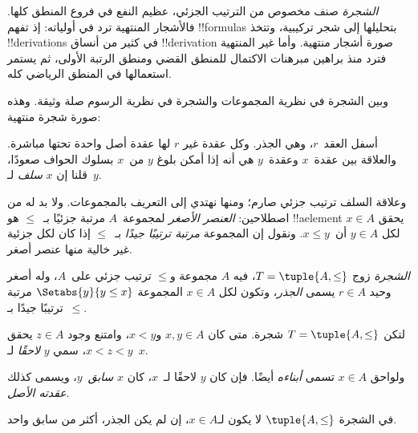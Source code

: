 \documentclass[../../../include/open-logic-section]{subfiles}
\begin{document}

\emph{الشجرة} صنف مخصوص من الترتيب الجزئي، عظيم النفع في فروع
المنطق كلها. فالأشجار المنتهية ترد في أولياته: إذ تفهم
!!{formula}s بتحليلها إلى شجر تركيبية، وتتخذ !!{derivation}s في
كثير من أنساق !!{derivation} صورة أشجار منتهية.
%
وأما غير المنتهية فترد منذ براهين مبرهنات الاكتمال للمنطق القضي
ومنطق الرتبة الأولى، ثم يستمر استعمالها في المنطق الرياضي كله.

وبين الشجرة في نظرية المجموعات والشجرة في نظرية الرسوم صلة وثيقة.
وهذه صورة شجرة منتهية:

\begin{center}
\end{center}

أسفل العقد~$r$، وهي الجذر. وكل عقدة غير $r$ لها عقدة أصل واحدة
تحتها مباشرة. والعلاقة بين عقدة~$x$ وعقدة~$y$ هي أنه إذا أمكن بلوغ $y$ من~$x$ بسلوك
الحواف صعودًا، قلنا إن $x$ \emph{سلف} لـ~$y$.

وعلاقة السلف ترتيب جزئي صارم؛ ومنها نهتدي إلى التعريف بالمجموعات.
ولا بد له من اصطلاحين: \emph{العنصر الأصغر} لمجموعة~$A$ مرتبة
جزئيًا بـ~$\le$ هو !!a{element} $x \in A$ يحقق لكل $y \in A$
أن~$x \le y$. ونقول إن المجموعة \emph{مرتبة ترتيبًا جيدًا}
بـ~$\le$ إذا كان لكل جزئية غير خالية منها عنصر أصغر.

\begin{defn}[الشجرة]
\emph{الشجرة} زوج $T = \tuple{A, \le}$، فيه $A$ مجموعة و$\le$
ترتيب جزئي على~$A$، وله أصغر وحيد $r \in A$ يسمى \emph{الجذر}،
وتكون لكل $x \in A$ المجموعة $\Setabs{y}{y \le x}$ مرتبة ترتيبًا
جيدًا بـ~$\le$.
\end{defn}

\begin{defn}[اللواحق]
لتكن $T = \tuple{A, \le}$ شجرة. متى كان $x,y \in A$ و$x < y$،
وامتنع وجود $z \in A$ يحقق $x < z < y$، سمي $y$ \emph{لاحقًا} لـ~$x$.
\end{defn}

ولواحق $x \in A$ تسمى \emph{أبناءه} أيضًا. فإن كان $y$ لاحقًا
لـ~$x$، كان $x$ \emph{سابق}~$y$، ويسمى كذلك \emph{عقدته الأصل}.

\begin{prop}
في الشجرة $\tuple{A,\le}$ لا يكون لـ$x \in A$، إن لم يكن الجذر،
أكثر من سابق واحد.
\end{prop}
\end{document}
